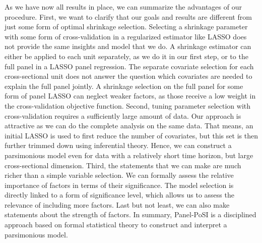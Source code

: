 \documentclass[11pt]{article}
\begin{document}
	
	As we have now all results in place, we can summarize the advantages of our procedure. First, we want to clarify that our goals and results are different from just some form of optimal shrinkage selection. Selecting a shrinkage parameter with some form of cross-validation in a regularized estimator like LASSO does not provide the same insights and model that we do. A shrinkage estimator can either be applied to each unit separately, as we do it in our first step, or to the full panel in a LASSO panel regression. The separate covariate selection for each cross-sectional unit does not answer the question which covariates are needed to explain the full panel jointly. A shrinkage selection on the full panel for some form of panel LASSO can neglect weaker factors, as those receive a low weight in the cross-validation objective function. Second, tuning parameter selection with cross-validation requires a sufficiently large amount of data. Our approach is attractive as we can do the complete analysis on the same data. That means, an initial LASSO is used to first reduce the number of covariates, but this set is then further trimmed down using inferential theory. Hence, we can construct a parsimonious model even for data with a relatively short time horizon, but large cross-sectional dimension. Third, the statements that we can make are much richer than a simple variable selection. We can formally assess the relative importance of factors in terms of their significance. The model selection is directly linked to a form of significance level, which allows us to assess the relevance of including more factors. Last but not least, we can also make statements about the strength of factors. In summary, Panel-PoSI is a disciplined approach based on formal statistical theory to construct and interpret a parsimonious model.
	
	
	
	
	
\end{document}
